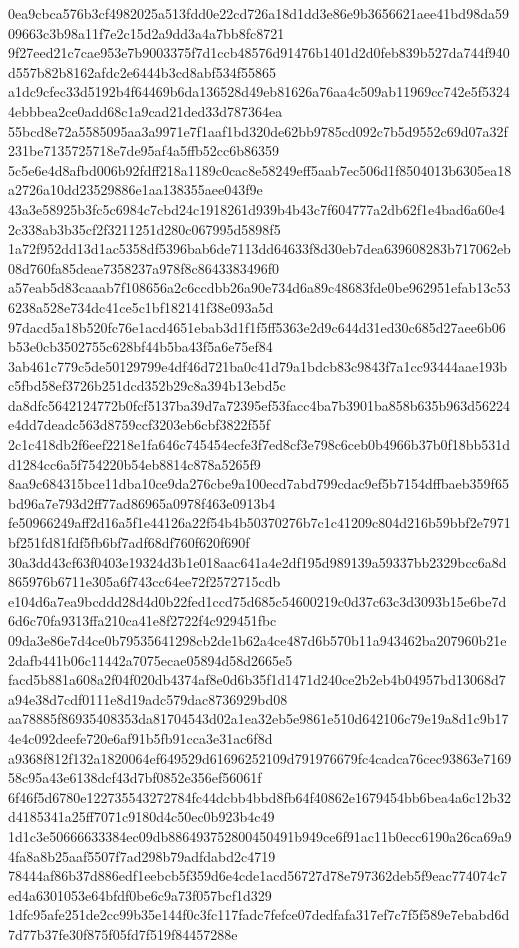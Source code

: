 \documentclass[11pt,a4paper]{article}
\begin{document}
{0ea9cbca576b3cf4982025a513fdd0e22cd726a18d1dd3e86e9b3656621aee41bd98da5909663c3b98a11f7e2c15d2a9dd3a4a7bb8fc8721
9f27eed21c7cae953e7b9003375f7d1ccb48576d91476b1401d2d0feb839b527da744f940d557b82b8162afdc2e6444b3cd8abf534f55865
a1dc9cfec33d5192b4f64469b6da136528d49eb81626a76aa4c509ab11969cc742e5f53244ebbbea2ce0add68c1a9cad21ded33d787364ea
55bcd8e72a5585095aa3a9971e7f1aaf1bd320de62bb9785cd092c7b5d9552c69d07a32f231be7135725718e7de95af4a5ffb52cc6b86359
5c5e6e4d8afbd006b92fdff218a1189c0cac8e58249eff5aab7ec506d1f8504013b6305ea18a2726a10dd23529886e1aa138355aee043f9e
43a3e58925b3fc5c6984c7cbd24c1918261d939b4b43c7f604777a2db62f1e4bad6a60e42c338ab3b35cf2f3211251d280c067995d5898f5
1a72f952dd13d1ac5358df5396bab6de7113dd64633f8d30eb7dea639608283b717062eb08d760fa85deae7358237a978f8c8643383496f0
a57eab5d83caaab7f108656a2c6ccdbb26a90e734d6a89c48683fde0be962951efab13c536238a528e734dc41ce5c1bf182141f38e093a5d
97dacd5a18b520fc76e1acd4651ebab3d1f1f5ff5363e2d9c644d31ed30c685d27aee6b06b53e0cb3502755c628bf44b5ba43f5a6e75ef84
3ab461c779c5de50129799e4df46d721ba0c41d79a1bdcb83c9843f7a1cc93444aae193bc5fbd58ef3726b251dcd352b29c8a394b13ebd5c
da8dfc5642124772b0fcf5137ba39d7a72395ef53facc4ba7b3901ba858b635b963d56224e4dd7deadc563d8759ccf3203eb6cbf3822f55f
2c1c418db2f6eef2218e1fa646c745454ecfe3f7ed8cf3e798c6ceb0b4966b37b0f18bb531dd1284cc6a5f754220b54eb8814c878a5265f9
8aa9c684315bce11dba10ce9da276cbe9a100ecd7abd799cdac9ef5b7154dffbaeb359f65bd96a7e793d2ff77ad86965a0978f463e0913b4
fe50966249aff2d16a5f1e44126a22f54b4b50370276b7c1c41209c804d216b59bbf2e7971bf251fd81fdf5fb6bf7adf68df760f620f690f
30a3dd43cf63f0403e19324d3b1e018aac641a4e2df195d989139a59337bb2329bcc6a8d865976b6711e305a6f743cc64ee72f2572715cdb
e104d6a7ea9bcddd28d4d0b22fed1ccd75d685c54600219c0d37c63c3d3093b15e6be7d6d6c70fa9313ffa210ca41e8f2722f4c929451fbc
09da3e86e7d4ce0b79535641298cb2de1b62a4ce487d6b570b11a943462ba207960b21e2dafb441b06c11442a7075ecae05894d58d2665e5
facd5b881a608a2f04f020db4374af8e0d6b35f1d1471d240ce2b2eb4b04957bd13068d7a94e38d7cdf0111e8d19adc579dac8736929bd08
aa78885f86935408353da81704543d02a1ea32eb5e9861e510d642106c79e19a8d1c9b174e4c092deefe720e6af91b5fb91cca3e31ac6f8d
a9368f812f132a1820064ef649529d61696252109d791976679fc4cadca76cec93863e716958c95a43e6138dcf43d7bf0852e356ef56061f
6f46f5d6780e122735543272784fc44dcbb4bbd8fb64f40862e1679454bb6bea4a6c12b32d4185341a25ff7071c9180d4c50ec0b923b4c49
1d1c3e50666633384ec09db886493752800450491b949ce6f91ac11b0ecc6190a26ca69a94fa8a8b25aaf5507f7ad298b79adfdabd2c4719
78444af86b37d886edf1eebcb5f359d6e4cde1acd56727d78e797362deb5f9eac774074c7ed4a6301053e64bfdf0be6c9a73f057bcf1d329
1dfc95afe251de2cc99b35e144f0c3fc117fadc7fefce07dedfafa317ef7c7f5f589e7ebabd6d7d77b37fe30f875f05fd7f519f84457288e
}
\end{document}
